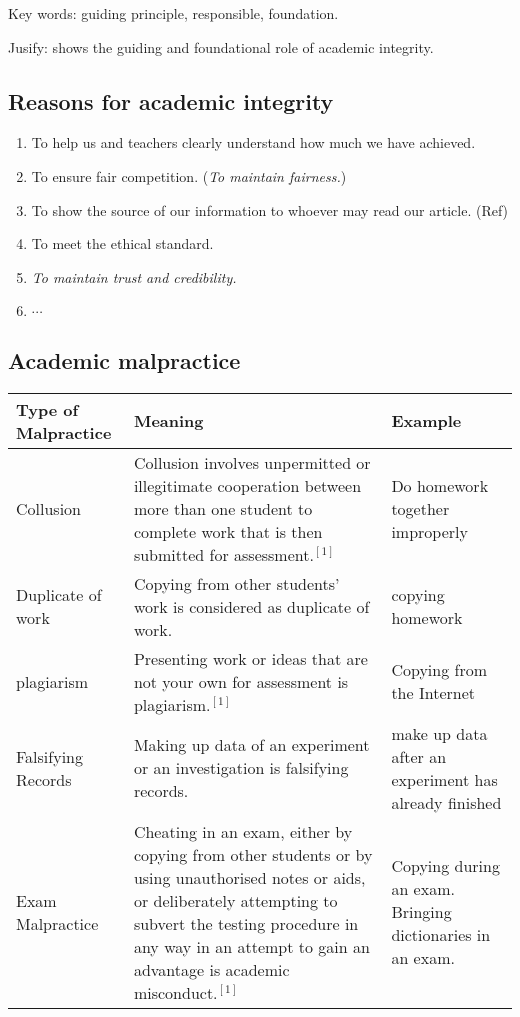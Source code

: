 \documentclass[a4paper]{article}
\begin{document}
Key words: guiding principle, responsible, foundation.

Jusify: shows the guiding and foundational role of academic integrity.

\subsection{Reasons for academic integrity}

\begin{enumerate}
    \item To help us and teachers clearly understand how much we have achieved.
    \item To ensure fair competition. (\textit{To maintain fairness.})
    \item To show the source of our information to whoever may read our article. (Ref)
    \item To meet the ethical standard.
    \item \textit{To maintain trust and credibility.}
    \item $\cdots$
\end{enumerate}

\subsection{Academic malpractice}

\begin{table}[ht!]
    \centering
    \begin{tabularx}{1.0 \textwidth}{|X|X|X|}
        \hline
        Type of Malpractice & Meaning & Example \\ 
        \hline
        Collusion  & Collusion involves unpermitted or illegitimate cooperation between more than one student to complete work that is then submitted for assessment.$^[1]$  & Do homework together improperly \\ \hline
        Duplicate of work & Copying from other students' work is considered as duplicate of work. & copying homework \\ \hline
        plagiarism  & Presenting work or ideas that are not your own for assessment is plagiarism.$^[1]$  & Copying from the Internet  \\ \hline
        Falsifying Records &  Making up data of an experiment or an investigation is falsifying records.  & make up data after an experiment has already finished\\ \hline
        Exam Malpractice  & Cheating in an exam, either by copying from other students or by using unauthorised notes or aids, or deliberately attempting to subvert the testing procedure in any way in an attempt to gain an advantage is academic misconduct.$^[1]$ &  Copying during an exam. Bringing dictionaries in an exam.\\
        \hline
    \end{tabularx}
\end{table}
\end{document}
